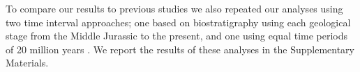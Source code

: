\documentclass[12pt,letterpaper]{article}
\begin{document}
To compare our results to previous studies we also repeated our analyses using two time interval approaches; one based on biostratigraphy \citep[e.g.][]{cisneros2010,prentice2011,Hughes20082013,bentonmodels2014} using each geological stage from the Middle Jurassic to the present, and one using equal time periods of 20 million years \citep{hopkinsdecoupling2013,bensonfaunal2014}.
We report the results of these analyses in the Supplementary Materials. %




\end{document}
